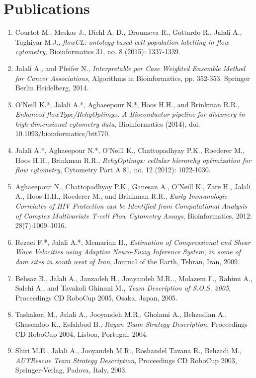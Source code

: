 \documentclass[11pt,a4paper,sans]{moderncv} %
\begin{document}

\section{Publications}

\begin{enumerate}
\item Courtot M., Meskas J., Diehl A. D., Droumeva R., Gottardo R., Jalali A., Taghiyar M.J., \emph{flowCL: ontology-based cell population labelling in flow cytometry}, Bioinformatics 31, no. 8 (2015): 1337-1339.

\item Jalali A., and Pfeifer N., \emph{Interpretable per Case Weighted Ensemble Method for Cancer Associations}, Algorithms in Bioinformatics, pp. 352-353. Springer Berlin Heidelberg, 2014.

\item O'Neill K.*, Jalali A.*, Aghaeepour N.*, Hoos H.H., and Brinkman R.R., \emph{Enhanced flowType/RchyOptimyx: A Bioconductor pipeline for discovery in high-dimensional cytometry data}, Bioinformatics (2014), doi: 10.1093/bioinformatics/btt770.

\item Jalali A.*, Aghaeepour N.*, O'Neill K., Chattopadhyay P.K., Roederer M., Hoos H.H., Brinkman R.R., \emph{RchyOptimyx: cellular hierarchy optimization for flow cytometry}, Cytometry Part A 81, no. 12 (2012): 1022-1030.

\item Aghaeepour N., Chattopadhyay P.K., Ganesan A., O'Neill K., Zare H., Jalali A., Hoos H.H., Roederer M., and Brinkman R.R., \emph{Early Immunologic Correlates of HIV Protection can be Identiﬁed from Computational Analysis of Complex Multivariate T-cell Flow Cytometry Assays},
Bioinformatics, 2012: 28(7):1009–1016.

\item Rezaei F.*, Jalali A.*, Memarian H., \emph{Estimation of Compressional and Shear Wave Velocities using Adaptive Neuro-Fuzzy Inference System, in some of dam sites in south west of Iran}, Journal of the Earth, Tehran, Iran, 2009.

\item Behsaz B., Jalali A., Janzadeh H., Jouyandeh M.R.., Molazem F., Rahimi A., Salehi A., and Tavakoli Ghinani M., \emph{Team Description of S.O.S. 2005}, Proceedings CD RoboCup 2005, Osaka, Japan, 2005.
  
\item Tashakori M., Jalali A., Jooyandeh M.R., Gholami A., Behzadian A., Ghasemloo K., Esfahbod B., \emph{Rayan Team Strategy Description}, Proceedings CD RoboCup 2004, Lisboa, Portugal, 2004.
  
\item Shiri M.E., Jalali A., Jooyandeh M.R., Roshandel Tavana R., Behzadi M., \emph{AUTRescue Team Strategy Description}, Proceedings CD RoboCup 2003, Springer-Verlag, Padova, Italy, 2003. 
\end{enumerate}
\end{document}

